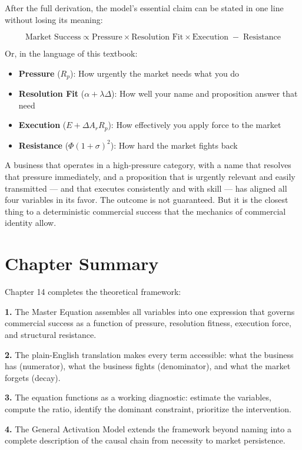 \documentclass[12pt, openany]{book}
\theoremstyle{thmstyle}
\theoremstyle{defstyle}
\begin{document}
After the full derivation, the model's essential claim can be stated in one line without losing its meaning:

\[
\text{Market Success} \propto \text{Pressure} \times \text{Resolution Fit} \times \text{Execution} \;-\; \text{Resistance}
\]

Or, in the language of this textbook:

\begin{itemize}[leftmargin=1.5em]
  \item \textbf{Pressure} ($R_p$): How urgently the market needs what you do
  \item \textbf{Resolution Fit} ($\alpha + \lambda\Delta$): How well your name and proposition answer that need
  \item \textbf{Execution} ($E + \Delta A_r R_p$): How effectively you apply force to the market
  \item \textbf{Resistance} ($\Phi(1+\sigma)^2$): How hard the market fights back
\end{itemize}

A business that operates in a high-pressure category, with a name that resolves that pressure immediately, and a proposition that is urgently relevant and easily transmitted --- and that executes consistently and with skill --- has aligned all four variables in its favor. The outcome is not guaranteed. But it is the closest thing to a deterministic commercial success that the mechanics of commercial identity allow.

\section{Chapter Summary}

Chapter 14 completes the theoretical framework:

\textbf{1.} The Master Equation assembles all variables into one expression that governs commercial success as a function of pressure, resolution fitness, execution force, and structural resistance.

\textbf{2.} The plain-English translation makes every term accessible: what the business has (numerator), what the business fights (denominator), and what the market forgets (decay).

\textbf{3.} The equation functions as a working diagnostic: estimate the variables, compute the ratio, identify the dominant constraint, prioritize the intervention.

\textbf{4.} The General Activation Model extends the framework beyond naming into a complete description of the causal chain from necessity to market persistence.
\end{document}
